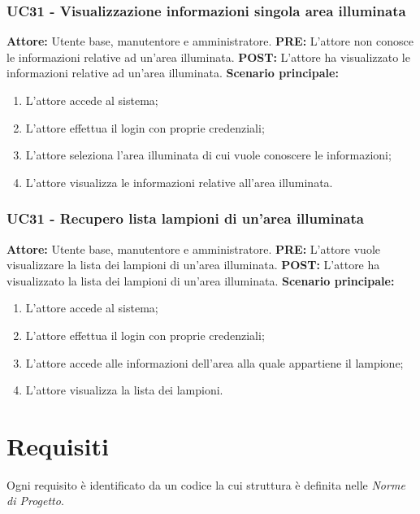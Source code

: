 \documentclass[a4paper, 12pt]{article}
\begin{document}
\subsubsection{UC31 - Visualizzazione informazioni singola area illuminata}
\textbf{Attore: } Utente base, manutentore e amministratore.\newline
\textbf{PRE: } L'attore non conosce le informazioni relative ad un'area illuminata.\newline
\textbf{POST: } L'attore ha visualizzato le informazioni relative ad un'area illuminata.\newline
\textbf{Scenario principale: }
\begin{enumerate}
    \item L'attore accede al sistema;
    \item L'attore effettua il login con proprie credenziali;
    \item L'attore seleziona l'area illuminata di cui vuole conoscere le informazioni;
    \item L'attore visualizza le informazioni relative all'area illuminata.
\end{enumerate}

\subsubsection{UC31 - Recupero lista lampioni di un'area illuminata}
\textbf{Attore: } Utente base, manutentore e amministratore.\newline
\textbf{PRE: } L'attore vuole visualizzare la lista dei lampioni di un'area illuminata.\newline
\textbf{POST: } L'attore ha visualizzato la lista dei lampioni di un'area illuminata.\newline
\textbf{Scenario principale: }
\begin{enumerate}
    \item L'attore accede al sistema;
    \item L'attore effettua il login con proprie credenziali;
    \item L'attore accede alle informazioni dell'area alla quale appartiene il lampione;
    \item L'attore visualizza la lista dei lampioni.
\end{enumerate}
\newpage
\section{Requisiti}
Ogni requisito è identificato da un codice la cui struttura è definita nelle \textit{Norme di Progetto}.
\end{document}
